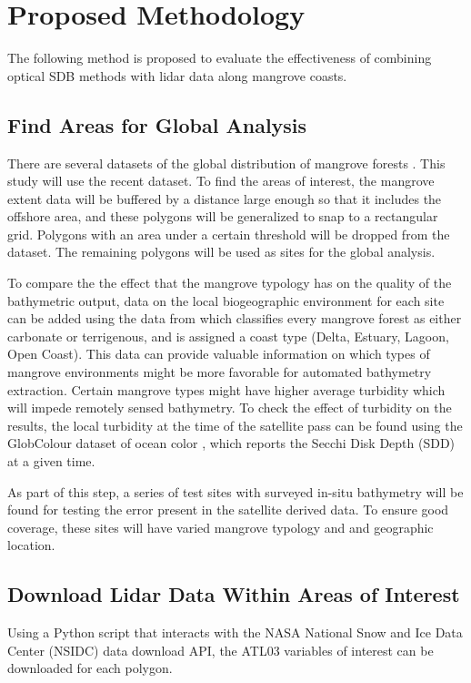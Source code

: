 \restoregeometry


\chapter{Proposed Methodology}

The following method is proposed to evaluate the effectiveness of combining optical SDB methods with lidar data along mangrove coasts.

\section{Find Areas for Global Analysis}

There are several datasets of the global distribution of mangrove forests \parencite{Worthington2020}. This study will use the recent \cite{Giri2011b} dataset. To find the areas of interest, the mangrove extent data will be buffered by a distance large enough so that it includes the offshore area, and these polygons will be generalized to snap to a rectangular grid. Polygons with an area under a certain threshold will be dropped from the dataset. The remaining polygons will be used as sites for the global analysis.

To compare the the effect that the mangrove typology has on the quality of the bathymetric output, data on the local biogeographic environment for each site can be added using the data from \cite{Worthington2020a} which classifies every mangrove forest as either carbonate or terrigenous, and is assigned a coast type (Delta, Estuary, Lagoon, Open Coast). This data can provide valuable information on which types of mangrove environments might be more favorable for automated bathymetry extraction. Certain mangrove types might have higher average turbidity which will impede remotely sensed bathymetry. To check the effect of turbidity on the results, the local turbidity at the time of the satellite pass can be found using the GlobColour dataset of ocean color \parencite{Garnesson2019}, which reports the Secchi Disk Depth (SDD) at a given time.

As part of this step, a series of test sites with surveyed in-situ bathymetry will be found for testing the error present in the satellite derived data. To ensure good coverage, these sites will have varied mangrove typology and and geographic location.

\section{Download Lidar Data Within Areas of Interest}
Using a Python script that interacts with the NASA National Snow and Ice Data Center (NSIDC) data download API, the ATL03 variables of interest can be downloaded for each polygon.

